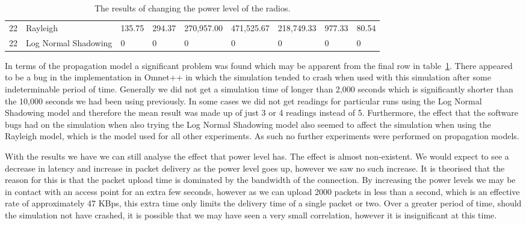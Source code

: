 {\begin{landscape}
\begin{table}
\begin{tabularx}{\linewidth}{|X|X|X|X|X|X|X|X|X|}
                        22 & Rayleigh & 135.75 & 294.37 & 270,957.00 & 471,525.67 & 218,749.33 & 977.33 & 80.54 \\
                        22 & Log Normal Shadowing & 0 & 0 & 0 & 0 & 0 & 0 & 0 \\
                        \hline
                    \end{tabularx}
                    \caption{The results of changing the power level of the radios.}
                    \label{tab:power_level}
                \end{table}
            \end{landscape}
        }


        In terms of the propagation model a significant problem was found which may be apparent from the final row in table~\ref{tab:power_level}. There appeared to be a bug in the implementation in Omnet++ in which the simulation tended to crash when used with this simulation after some indeterminable period of time. Generally we did not get a simulation time of longer than 2,000 seconds which is significantly shorter than the 10,000 seconds we had been using previously. In some cases we did not get readings for particular runs using the Log Normal Shadowing model and therefore the mean result was made up of just 3 or 4 readings instead of 5. Furthermore, the effect that the software bugs had on the simulation when also trying the Log Normal Shadowing model also seemed to affect the simulation when using the Rayleigh model, which is the model used for all other experiments. As such no further experiments were performed on propagation models. 

        With the results we have we can still analyse the effect that power level has. The effect is almost non-existent. We would expect to see a decrease in latency and increase in packet delivery as the power level goes up, however we saw no such increase. It is theorised that the reason for this is that the packet upload time is dominated by the bandwidth of the connection. By increasing the power levels we may be in contact with an access point for an extra few seconds, however as we can upload 2000 packets in less than a second, which is an effective rate of approximately 47 KBps, this extra time only limits the delivery time of a single packet or two. Over a greater period of time, should the simulation not have crashed, it is possible that we may have seen a very small correlation, however it is insignificant at this time. 


